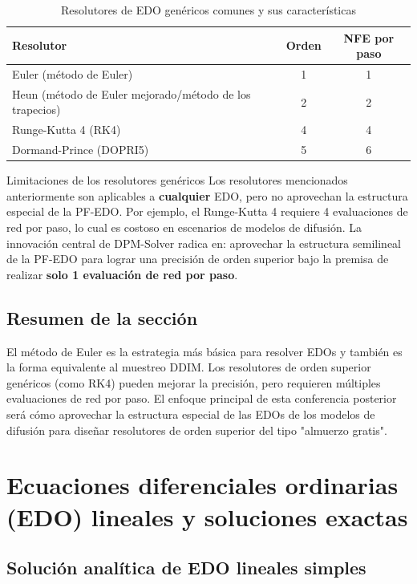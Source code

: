 \documentclass[a4paper]{article}
\begin{document}
\begin{table}[H]
\centering
\begin{tabular}{lcc}
\toprule
\textbf{Resolutor} & \textbf{Orden} & \textbf{NFE por paso} \\
\midrule
Euler (método de Euler) & 1 & 1 \\
Heun (método de Euler mejorado/método de los trapecios) & 2 & 2 \\
Runge-Kutta 4 (RK4) & 4 & 4 \\
Dormand-Prince (DOPRI5) & 5 & 6 \\
\bottomrule
\end{tabular}
\caption{Resolutores de EDO genéricos comunes y sus características}
\end{table}

\begin{warningbox}{Limitaciones de los resolutores genéricos}
Los resolutores mencionados anteriormente son aplicables a \textbf{cualquier} EDO, pero no aprovechan la estructura especial de la PF-EDO. Por ejemplo, el Runge-Kutta 4 requiere 4 evaluaciones de red por paso, lo cual es costoso en escenarios de modelos de difusión. La innovación central de DPM-Solver radica en: aprovechar la estructura semilineal de la PF-EDO para lograr una precisión de orden superior bajo la premisa de realizar \textbf{solo 1 evaluación de red por paso}.
\end{warningbox}

\subsection{Resumen de la sección}

El método de Euler es la estrategia más básica para resolver EDOs y también es la forma equivalente al muestreo DDIM. Los resolutores de orden superior genéricos (como RK4) pueden mejorar la precisión, pero requieren múltiples evaluaciones de red por paso. El enfoque principal de esta conferencia posterior será cómo aprovechar la estructura especial de las EDOs de los modelos de difusión para diseñar resolutores de orden superior del tipo "almuerzo gratis".
\section{Ecuaciones diferenciales ordinarias (EDO) lineales y soluciones exactas}

\subsection{Solución analítica de EDO lineales simples}
\end{document}
